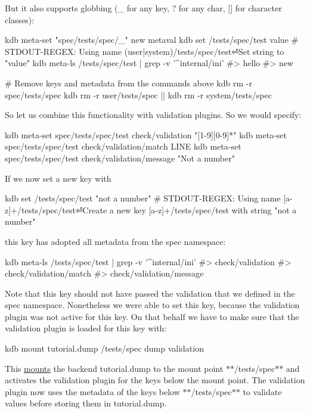 But it also supports globbing ({\ttfamily \+\_\+} for any key, {\ttfamily ?} for any char, {\ttfamily \mbox{[}\mbox{]}} for character classes)\+:


\begin{DoxyCode}
kdb meta-set "spec/tests/spec/\_" new metaval
kdb set /tests/spec/test value
# STDOUT-REGEX: Using name (user|system)/tests/spec/test⏎Set string to "value"
kdb meta-ls /tests/spec/test | grep -v '^internal/ini'
#> hello
#> new

# Remove keys and metadata from the commands above
kdb rm -r spec/tests/spec
kdb rm -r user/tests/spec || kdb rm -r system/tests/spec
\end{DoxyCode}


So let us combine this functionality with validation plugins. So we would specify\+:


\begin{DoxyCode}
kdb meta-set spec/tests/spec/test check/validation "[1-9][0-9]*"
kdb meta-set spec/tests/spec/test check/validation/match LINE
kdb meta-set spec/tests/spec/test check/validation/message "Not a number"
\end{DoxyCode}


If we now set a new key with


\begin{DoxyCode}
kdb set /tests/spec/test "not a number"
# STDOUT-REGEX: Using name [a-z]+/tests/spec/test⏎Create a new key [a-z]+/tests/spec/test with string "not
       a number"
\end{DoxyCode}


this key has adopted all metadata from the spec namespace\+:


\begin{DoxyCode}
kdb meta-ls /tests/spec/test | grep -v '^internal/ini'
#> check/validation
#> check/validation/match
#> check/validation/message
\end{DoxyCode}


Note that this key should not have passed the validation that we defined in the spec namespace. Nonetheless we were able to set this key, because the validation plugin was not active for this key. On that behalf we have to make sure that the validation plugin is loaded for this key with\+:


\begin{DoxyCode}
kdb mount tutorial.dump /tests/spec dump validation
\end{DoxyCode}


This \hyperlink{doc_tutorials_mount_md}{mounts} the backend {\ttfamily tutorial.\+dump} to the mount point $\ast$$\ast$/tests/spec$\ast$$\ast$ and activates the validation plugin for the keys below the mount point. The validation plugin now uses the metadata of the keys below $\ast$$\ast$/tests/spec$\ast$$\ast$ to validate values before storing them in {\ttfamily tutorial.\+dump}.

